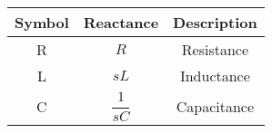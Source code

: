 \begin{tabular}{|c|c|c|}
    \hline
     \textbf{Symbol} & \textbf{Reactance} &
     \textbf{Description}\\
    \hline
    R &  $R$ & Resistance\\
    \hline
    L &  $sL$ & Inductance\\
    \hline
    C & $\dfrac{1}{sC}$ & Capacitance\\[6pt]
    \hline
\end{tabular}
